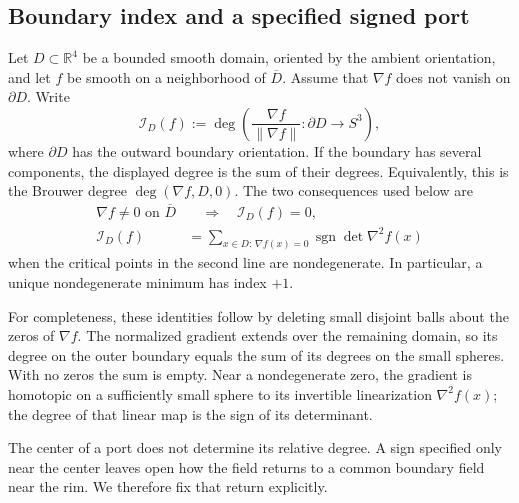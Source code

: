 \documentclass[11pt,a4paper]{article}
\theoremstyle{definition}
\theoremstyle{remark}
\begin{document}
\subsection{Boundary index and a specified signed port}

Let $D\subset\mathbb R^4$ be a bounded smooth domain, oriented by the
ambient orientation, and let $f$ be smooth on a neighborhood of
$\overline D$.  Assume that $\nabla f$ does not vanish on $\partial D$.
Write
\[
 \mathcal I_D(f)
 :=\deg\left(\frac{\nabla f}{\|\nabla f\|}:
                   \partial D\longrightarrow S^3\right),
\]
where $\partial D$ has the outward boundary orientation.  If the boundary
has several components, the displayed degree is the sum of their degrees.
Equivalently, this is the Brouwer degree
$\deg(\nabla f,D,0)$.  The two consequences used below are
\begin{align}
 \nabla f\ne0\text{ on }\overline D
       &\quad\Longrightarrow\quad \mathcal I_D(f)=0,
       \label{eq:zero-free-index}\\
 \mathcal I_D(f)
       &=\sum_{x\in D:\,\nabla f(x)=0}
                      \operatorname{sgn}\det\nabla^2 f(x)
       \label{eq:critical-point-index}
\end{align}
when the critical points in the second line are nondegenerate.  In
particular, a unique nondegenerate minimum has index $+1$.

For completeness, these identities follow by deleting small disjoint
balls about the zeros of $\nabla f$.  The normalized gradient extends over
the remaining domain, so its degree on the outer boundary equals the sum
of its degrees on the small spheres.  With no zeros the sum is empty.
Near a nondegenerate zero, the gradient is homotopic on a sufficiently
small sphere to its invertible linearization $\nabla^2 f(x)$; the degree
of that linear map is the sign of its determinant.

The center of a port does not determine its relative degree.  A sign
specified only near the center leaves open how the field returns to a
common boundary field near the rim.  We therefore fix that return
explicitly.
\end{document}
